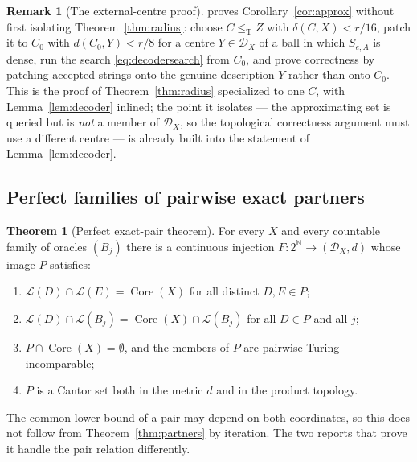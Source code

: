 \documentclass[11pt,letterpaper]{article}
\theoremstyle{definition}
\newtheorem{theorem}[definition]{Theorem}
\newtheorem{remark}[definition]{Remark}
\numberwithin{equation}{section}
\newcommand{\N}{\mathbb N}
\newcommand{\Cantor}{2^{\N}}
\newcommand{\leT}{\le_{\mathrm T}}
\newcommand{\DX}[1]{\mathcal D_{#1}}
\newcommand{\Low}{\mathcal L}
\newcommand{\Core}{\operatorname{Core}}
\newcommand{\src}[1]{\leavevmode{\sffamily\footnotesize\color{Steel}[#1]}}
\newcommand{\rep}[1]{\leavevmode{\sffamily\small\color{Steel}R#1}}
\begin{document}
\begin{remark}[The external-centre proof]\label{rem:external}
\rep9 proves Corollary~\ref{cor:approx} without first isolating Theorem~\ref{thm:radius}: choose $C\leT Z$ with $\delta(C,X)<r/16$, patch it to $C_0$ with $d(C_0,Y)<r/8$ for a centre $Y\in\DX X$ of a ball in which $S_{e,A}$ is dense, run the search \eqref{eq:decodersearch} from $C_0$, and prove correctness by patching accepted strings onto the genuine description $Y$ rather than onto $C_0$. This is the proof of Theorem~\ref{thm:radius} specialized to one $C$, with Lemma~\ref{lem:decoder} inlined; the point it isolates --- the approximating set is queried but is \emph{not} a member of $\DX X$, so the topological correctness argument must use a different centre --- is already built into the statement of Lemma~\ref{lem:decoder}.
\end{remark}

\subsection{Perfect families of pairwise exact partners}
\begin{theorem}[Perfect exact-pair theorem]\label{thm:perfect}\src{R8; R9 with prescribed oracles}
For every $X$ and every countable family of oracles $(B_j)$ there is a continuous injection $F:\Cantor\to(\DX X,d)$ whose image $P$ satisfies:
\begin{enumerate}[label=\textup{(\alph*)}]
\item $\Low(D)\cap\Low(E)=\Core(X)$ for all distinct $D,E\in P$;
\item $\Low(D)\cap\Low(B_j)=\Core(X)\cap\Low(B_j)$ for all $D\in P$ and all $j$;
\item $P\cap\Core(X)=\emptyset$, and the members of $P$ are pairwise Turing incomparable;
\item $P$ is a Cantor set both in the metric $d$ and in the product topology.
\end{enumerate}
\end{theorem}

The common lower bound of a pair may depend on both coordinates, so this does not follow from Theorem~\ref{thm:partners} by iteration. The two reports that prove it handle the pair relation differently.
\end{document}
